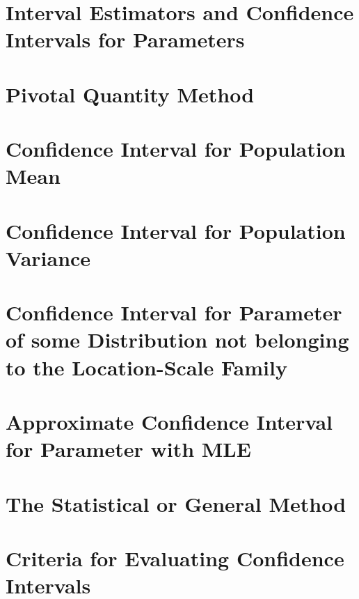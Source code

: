 \section{Interval Estimators and Confidence Intervals for Parameters}

\section{Pivotal Quantity Method}

\section{Confidence Interval for Population Mean}

\section{Confidence Interval for Population Variance}

\section{Confidence Interval for Parameter of some Distribution not belonging to the Location-Scale Family}

\section{Approximate Confidence Interval for Parameter with MLE}

\section{The Statistical or General Method}

\section{Criteria for Evaluating Confidence Intervals}

